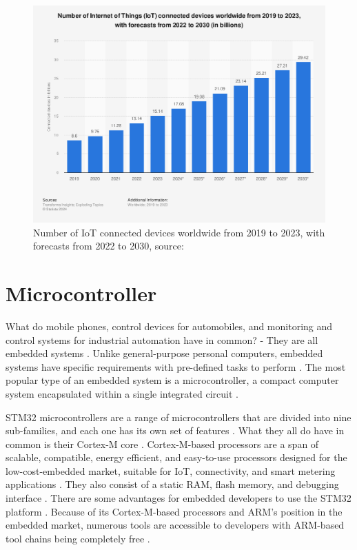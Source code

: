 \begin{figure}[H]
  \includegraphics[width=\linewidth]{statistic_id1183457_number-of-iot-connected-devices-worldwide-2019-2023-with-forecasts-to-2030.png}
  \caption{Number of IoT connected devices worldwide from 2019 to 2023, with forecasts from 2022 to 2030, source: \cite{Statista2023}}
  \label{fig:Number of Internet of Things (IoT) connected devices worldwide from 2019 to 2023, with forecasts from 2022 to 2030}
\end{figure}

\section{Microcontroller}
What do mobile phones, control devices for automobiles, and monitoring and control systems for industrial automation have in common? - They are all embedded systems \cite{Lizarraga2006}.
Unlike general-purpose personal computers, embedded systems have specific requirements with pre-defined tasks to perform \cite{Lizarraga2006}.
The most popular type of an embedded system is a microcontroller, a compact computer system encapsulated within a single integrated circuit \cite{Lambert2017}.

STM32 microcontrollers are a range of microcontrollers that are divided into nine sub-families, and each one has its own set of features \cite{Noviello2017}. What they all do have in common is their Cortex-M core \cite{Noviello2017}. Cortex-M-based processors are a span of scalable, compatible, energy efficient, and easy-to-use processors designed for the low-cost-embedded market, suitable for IoT, connectivity, and smart metering applications \cite{Noviello2017}.
They also consist of a static RAM, flash memory, and debugging interface \cite{Noviello2017}.
There are some advantages for embedded developers to use the STM32 platform \cite{Noviello2017}.
Because of its Cortex-M-based processors and ARM's position in the embedded market, numerous tools are accessible to developers with ARM-based tool chains being completely free \cite{Noviello2017}.

